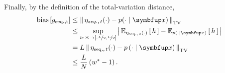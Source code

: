 \begin{proofEnd}
  Finally, by the definition of the total-variation distance, 
 \begin{align}
   \mathrm{bias}\left[ g_{\mathrm{seq., t}} \right]
   &\leq \DTV{\eta_{seq.,\, t}(\cdot)}{p(\cdot\mid\vx)} \\
   &\leq \sup_{h : \mathcal{Z} \rightarrow \left[ \text{-}\nicefrac{L}{2}, \nicefrac{L}{2} \right]} \left|\, \Esub{\eta_{\mathrm{seq.},\, t}(\cdot)}{h} - \Esub{p(\cdot\mid\vx)}{h} \,\right| \\
   &= L \, \DTV{ \eta_{\mathrm{seq.},\, t}(\cdot) }{p\left(\cdot\mid\vx\right)}  \\
   &\leq \frac{L}{N} \left( w^* - 1 \right).
 \end{align}
\end{proofEnd}

